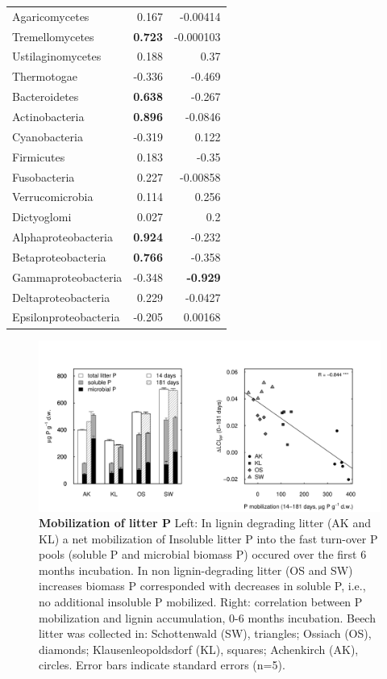 \documentclass[10pt]{article}
\begin{document}
\begin{flushleft}
\begin{table}[h!]
{\begin{tabular}{lrr}
  Agaricomycetes & 0.167 & -0.00414 \\ 
  Tremellomycetes & \textbf{ 0.723 } & -0.000103 \\ 
  Ustilaginomycetes & 0.188 & 0.37 \\ 
  Thermotogae & -0.336 & -0.469 \\ 
  Bacteroidetes & \textbf{ 0.638 } & -0.267 \\ 
  Actinobacteria & \textbf{ 0.896 } & -0.0846 \\ 
  Cyanobacteria & -0.319 & 0.122 \\ 
  Firmicutes & 0.183 & -0.35 \\ 
  Fusobacteria & 0.227 & -0.00858 \\ 
  Verrucomicrobia & 0.114 & 0.256 \\ 
  Dictyoglomi & 0.027 &  0.2 \\ 
  Alphaproteobacteria & \textbf{ 0.924 } & -0.232 \\ 
  Betaproteobacteria & \textbf{ 0.766 } & -0.358 \\ 
  Gammaproteobacteria & -0.348 & \textbf{ -0.929 } \\ 
  Deltaproteobacteria & 0.229 & -0.0427 \\ 
  Epsilonproteobacteria & -0.205 & 0.00168 \\ 
   \hline
\end{tabular}
}
\end{table}
\begin{figure}[!h]
\begin{center}
\includegraphics{ligpaper-figphos}
\end{center}
\caption{
{\bf Mobilization of litter P} Left: In lignin degrading litter (AK and KL) a net mobilization of Insoluble litter P into the fast turn-over P pools (soluble P and microbial biomass P) occured over the first 6 months incubation. In non lignin-degrading litter (OS and SW) increases biomass P corresponded with decreases in soluble P, i.e., no additional insoluble P mobilized. Right: correlation between P mobilization and lignin accumulation, 0-6 months incubation. Beech litter was collected in: Schottenwald (SW), triangles; Ossiach (OS), diamonds; Klausenleopoldsdorf (KL), squares; Achenkirch (AK), circles. Error bars indicate standard errors (n=5).}
\end{figure}


\end{flushleft}
\end{document}
